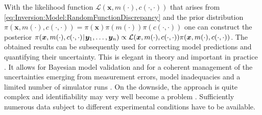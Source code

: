 With the likelihood function \(\mathcal{L}(\bm{x},m(\cdot),c(\cdot,\cdot))\) that arises from \cref{eq:Inversion:Model:RandomFunctionDiscrepancy}
and the prior distribution \(\pi(\bm{x},m(\cdot),c(\cdot,\cdot)) = \pi(\bm{x}) \pi(m(\cdot)) \pi(c(\cdot,\cdot))\) one can construct the posterior
\(\pi(\bm{x},m(\cdot),c(\cdot,\cdot) {\:\!}|{\:\!} \bm{y}_1,\ldots,\bm{y}_n) \propto \mathcal{L}(\bm{x},m(\cdot),c(\cdot,\cdot)) \pi(\bm{x},m(\cdot),c(\cdot,\cdot))\).
The obtained results can be subsequently used for correcting model predictions and quantifying their uncertainty.
This is elegant in theory and important in practice \cite{Bayesian:Brynjarsdottir2014}.
It allows for Bayesian model validation \cite{Bayesian:Bayarri2007,Bayesian:Wang2009} and for a coherent management of the uncertainties
emerging from measurement errors, model inadequacies and a limited number of simulator runs \cite{Kriging:Bilionis2014}.
On the downside, the approach is quite complex and identifiability may very well become a problem \cite{Bayesian:Arendt2012:a,Bayesian:Arendt2012:b}.
Sufficiently numerous data subject to different experimental conditions have to be available.

